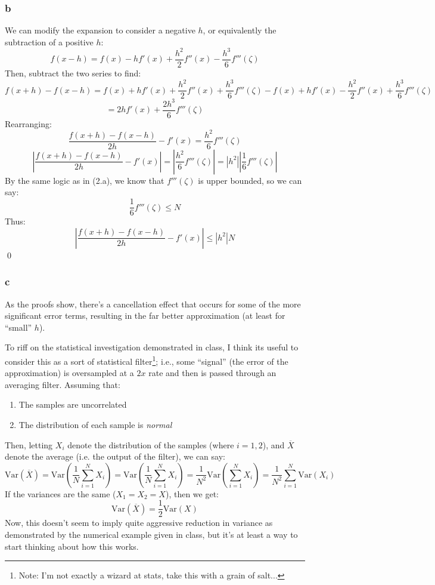 \documentclass[11pt]{report}
\theoremstyle{definition}
\begin{document}
\subsubsection*{b}
We can modify the expansion to consider a negative $h$, or equivalently the subtraction of
a positive $h$:
\[
	f(x-h) = f(x) - hf'(x) + \frac{h^2}{2}f''(x)-\frac{h^3}{6}f'''(\zeta)
\]
Then, subtract the two series to find:
\[
	f(x+h)-f(x-h)
	= f(x)+hf'(x)+\frac{h^2}{2}f''(x)+\frac{h^3}{6}f'''(\zeta)
	- f(x)+hf'(x)-\frac{h^2}{2}f''(x)+\frac{h^3}{6}f'''(\zeta)
\]
\[
	= 2hf'(x)+\frac{2h^3}{6}f'''(\zeta)
\]
Rearranging:
\[
	\frac{f(x+h)-f(x-h)}{2h} -f'(x)
	= \frac{h^2}{6}f'''(\zeta)
\]
\[
	\left|\frac{f(x+h)-f(x-h)}{2h} -f'(x)\right|
	= \left|\frac{h^2}{6}f'''(\zeta)\right|
	= \left|h^2\right|\left|\frac{1}{6}f'''(\zeta)\right|
\]
By the same logic as in (2.a), we know that $f'''(\zeta)$ is upper bounded, so we can say:
\[\frac{1}{6}f'''(\zeta)\leq N\]
Thus:
\[
	\left|\frac{f(x+h)-f(x-h)}{2h} -f'(x)\right|
	\leq \left|h^2\right|N
\]
\qed

\subsubsection*{c}
As the proofs show, there's a cancellation effect that occurs for some of the more significant
error terms, resulting in the far better approximation (at least for ``small'' $h$).

To riff on the statistical investigation demonstrated in class, I think its
useful to consider this as a sort of statistical filter\footnote{Note: I'm not
	exactly a wizard at stats, take this with a grain of salt...}; i.e., some
``signal'' (the error of the approximation) is oversampled at a $2x$ rate and then is
passed through an averaging filter. Assuming that:
\begin{enumerate}
	\item The samples are uncorrelated
	\item The distribution of each sample is \textit{normal}
\end{enumerate}
Then, letting $X_i$ denote the distribution of the samples (where $i=1,2$), and
$\overline{X}$ denote the average (i.e. the output of the filter), we can say:
\[
	\mathrm{Var}(\overline{X})
	= \mathrm{Var}\left(\frac{1}{N}\sum_{i=1}^N X_i\right)
	= \mathrm{Var}\left(\frac{1}{N}\sum_{i=1}^N X_i\right)
	= \frac{1}{N^2}\mathrm{Var}\left(\sum_{i=1}^N X_i\right)
	= \frac{1}{N^2}\sum_{i=1}^N \mathrm{Var}\left(X_i\right)
\]
If the variances are the same ($X_1 = X_2 = X$), then we get:
\[ \mathrm{Var}(\overline{X}) = \frac{1}{2}\mathrm{Var}(X) \]
Now, this doesn't seem to imply quite aggressive reduction in variance as demonstrated by the numerical example
given in class, but it's at least a way to start thinking about how this works.
\end{document}
